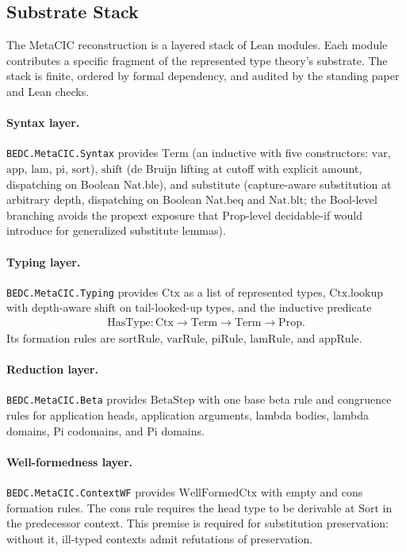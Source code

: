 \subsection{Substrate Stack}\label{subsec:substrate-stack}

The MetaCIC reconstruction is a layered stack of Lean modules. Each module
contributes a specific fragment of the represented type theory's substrate.
The stack is finite, ordered by formal dependency, and audited by the standing
paper and Lean checks.

\paragraph{Syntax layer.} \texttt{BEDC.MetaCIC.Syntax} provides
$\mathrm{Term}$ (an inductive with five constructors: $\mathrm{var}$,
$\mathrm{app}$, $\mathrm{lam}$, $\mathrm{pi}$, $\mathrm{sort}$),
$\mathrm{shift}$ (de Bruijn lifting at cutoff with explicit amount,
dispatching on Boolean $\mathrm{Nat.ble}$), and $\mathrm{substitute}$
(capture-aware substitution at arbitrary depth, dispatching on Boolean
$\mathrm{Nat.beq}$ and $\mathrm{Nat.blt}$; the Bool-level branching avoids the
$\mathrm{propext}$ exposure that Prop-level decidable-if would introduce for
generalized substitute lemmas).

\paragraph{Typing layer.} \texttt{BEDC.MetaCIC.Typing} provides
$\mathrm{Ctx}$ as a list of represented types, $\mathrm{Ctx.lookup}$ with
depth-aware $\mathrm{shift}$ on tail-looked-up types, and the inductive
predicate
$$
\begin{aligned}
\mathrm{HasType} : \mathrm{Ctx} \to \mathrm{Term} \to \mathrm{Term}
  \to \mathrm{Prop}.
\end{aligned}
$$
Its formation rules are $\mathrm{sortRule}$, $\mathrm{varRule}$,
$\mathrm{piRule}$, $\mathrm{lamRule}$, and $\mathrm{appRule}$.

\paragraph{Reduction layer.} \texttt{BEDC.MetaCIC.Beta} provides
$\mathrm{BetaStep}$ with one base beta rule and congruence rules for
application heads, application arguments, lambda bodies, lambda domains,
Pi codomains, and Pi domains.

\paragraph{Well-formedness layer.} \texttt{BEDC.MetaCIC.ContextWF} provides
$\mathrm{WellFormedCtx}$ with empty and cons formation rules. The cons rule
requires the head type to be derivable at $\mathrm{Sort}$ in the predecessor
context. This premise is required for substitution preservation: without it,
ill-typed contexts admit refutations of preservation.

